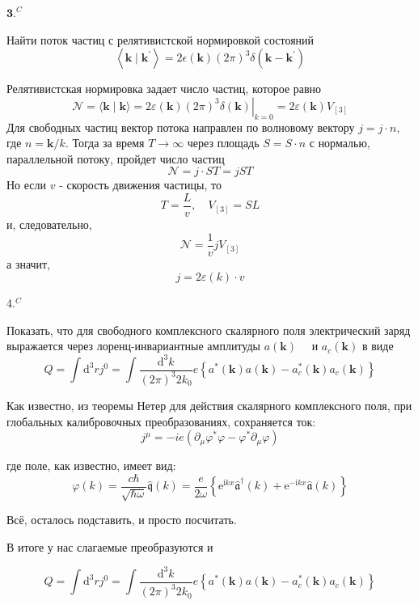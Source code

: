 \documentclass[a4paper,12pt]{article} %
\begin{document}
\begin{ttask}$\mathbf{3 .}^{C}$ 

Найти поток частиц с релятивистской нормировкой состояний
$$
\left\langle\boldsymbol{k} \mid \boldsymbol{k}^{\prime}\right\rangle=
2 \epsilon(\boldsymbol{k})(2 \pi)^{3} \delta\left(\boldsymbol{k}-\boldsymbol{k}^{\prime}\right)
$$



Релятивистская нормировка задает число частиц, которое равно
$$
\mathcal{N}=\langle\boldsymbol{k} \mid \boldsymbol{k}\rangle=\left.2 \varepsilon(\boldsymbol{k})(2 \pi)^{3} \delta(\boldsymbol{k})\right|_{k=0}=2 \varepsilon(\boldsymbol{k}) V_{[3]}
$$
Для свободных частиц вектор потока направлен по волновому вектору $j=j \cdot n,$ где $n=\boldsymbol{k} / k .$ 
Тогда за время $T \rightarrow \infty$ через площадь $S=S \cdot n$ с нормалью, параллельной потоку, пройдет число частиц
$$
\mathcal{N}=j \cdot S T=j S T
$$
Но если $v$ - скорость движения частицы, то
$$
T=\frac{L}{v}, \quad V_{[3]}=S L
$$
и, следовательно,
$$
\mathcal{N}=\frac{1}{v} j V_{[3]}
$$
а значит,
$$
j=2 \varepsilon(k) \cdot v
$$




\end{ttask}



\begin{ttask} 4.$^{C}$ 
	
Показать, что для свободного комплексного скалярного поля электрический заряд выражается через 
лоренц-инвариантные амплитуды $a(\boldsymbol{k}) \quad$ и $a_{c}(\boldsymbol{k})$ в виде
$$
Q=
\int \mathrm{d}^{3} r j^{0}=
\int \frac{\mathrm{d}^{3} k}{(2 \pi)^{3} 2 k_{0}} e\left\{a^{*}(\boldsymbol{k}) a(\boldsymbol{k})-a_{c}^{*}(\boldsymbol{k}) a_{c}(\boldsymbol{k})\right\}
$$


Как известно, из теоремы Нетер для действия скалярного 
комплексного поля, при глобальных калибровочных преобразованиях, сохраняется ток:
\[ 
j^\mu 
=
-i e (\partial_\mu \varphi^{*}\varphi -\varphi^{*}\partial_\mu \varphi)
 \]


где поле, как известно, имеет вид:
$$
\varphi(k)=\frac{c \hbar}{\sqrt{\hbar \omega}} \hat{\mathfrak{q}}(k)=\frac{e}{2 \omega}\left\{\mathrm{e}^{\mathrm{i} k x} \hat{\mathfrak{a}}^{\dagger}(k)+\mathrm{e}^{-\mathrm{i} k x} \hat{\mathfrak{a}}(k)\right\}
$$


Всё, осталось подставить, и просто посчитать.


В итоге у нас слагаемые преобразуются и 

$$
Q=
\int \mathrm{d}^{3} r j^{0}=
\int \frac{\mathrm{d}^{3} k}{(2 \pi)^{3} 2 k_{0}} e\left\{a^{*}(\boldsymbol{k}) a(\boldsymbol{k})-a_{c}^{*}(\boldsymbol{k}) a_{c}(\boldsymbol{k})\right\}
$$









\end{ttask}
\end{document}
